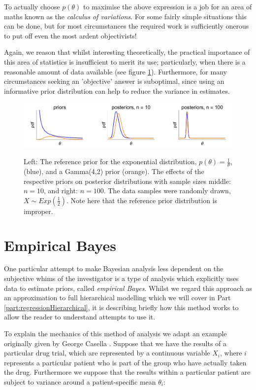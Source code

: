 \documentclass[11pt,fullpage]{book}
\begin{document}
To actually choose $p(\theta)$ to maximise the above expression is a job for an area of maths known as the \textit{calculus of variations}. For some fairly simple situations this can be done, but for most circumstances the required work is sufficiently onerous to put off even the most ardent objectivists!

Again, we reason that whilst interesting theoretically, the practical importance of this area of statistics is insufficient to merit its use; particularly, when there is a reasonable amount of data available (see figure \ref{fig:Objective_referencePriorsExponential}). Furthermore, for many circumstances seeking an 'objective' answer is suboptimal, since using an informative prior distribution can help to reduce the variance in estimates. 

\begin{figure}
\centering
\scalebox{0.4} 
{\includegraphics{Objective_referencePriorsExponential.pdf}}
\caption{Left: The reference prior for the exponential distribution, $p(\theta)=\frac{1}{\theta}$, (blue), and a Gamma(4,2) prior (orange). The effects of the respective priors on posterior distributions with sample sizes middle: $n=10$, and right: $n=100$. The data samples were randomly drawn, $X\sim Exp(\frac{1}{2})$. Note here that the reference prior distribution is improper.}\label{fig:Objective_referencePriorsExponential}
\end{figure}

\section{Empirical Bayes}
One particular attempt to make Bayesian analysis less dependent on the subjective whims of the investigator is a type of analysis which explicitly uses data to estimate priors, called \textit{empirical Bayes}. Whilst we regard this approach as an approximation to full hierarchical modelling which we will cover in Part \ref{part:regressionHierarchical}, it is describing briefly how this method works to allow the reader to understand attempts to use it.

To explain the mechanics of this method of analysis we adapt an example originally given by George Casella \cite{casella1985introduction}. Suppose that we have the results of a particular drug trial, which are represented by a continuous variable $X_i$, where $i$ represents a particular patient who is part of the group who have actually taken the drug. Furthermore we suppose that the results within a particular patient are subject to variance around a patient-specific mean $\theta_i$:
\end{document}
